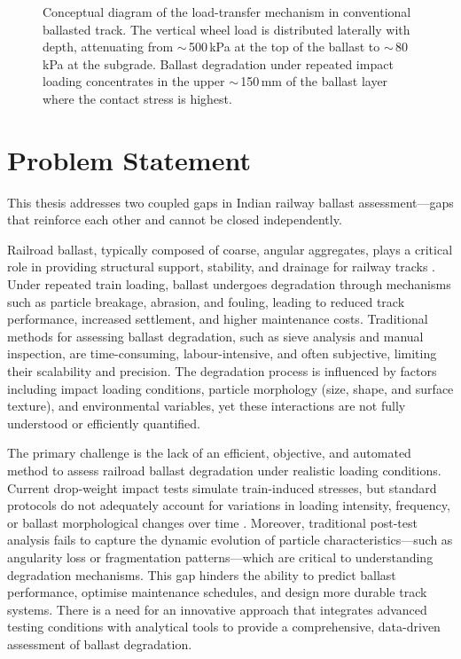 \begin{figure}[ht]
\caption{Conceptual diagram of the load-transfer mechanism in
         conventional ballasted track. The vertical wheel load is
         distributed laterally with depth, attenuating from
         $\sim$\,500\,kPa at the top of the ballast to $\sim$\,80\,kPa
         at the subgrade. Ballast degradation under repeated impact
         loading concentrates in the upper $\sim$\,150\,mm of the
         ballast layer where the contact stress is highest.}
\label{fig:load-transfer}
\end{figure}

\section{Problem Statement}
\label{sec:intro-problem}

This thesis addresses two coupled gaps in Indian railway ballast
assessment---gaps that reinforce each other and cannot be closed
independently.

Railroad ballast, typically composed of coarse, angular aggregates, plays a
critical role in providing structural support, stability, and drainage for
railway tracks \citep{Selig1994}. Under repeated train loading, ballast
undergoes degradation through mechanisms such as particle breakage,
abrasion, and fouling, leading to reduced track performance, increased
settlement, and higher maintenance costs. Traditional methods for assessing
ballast degradation, such as sieve analysis and manual inspection, are
time-consuming, labour-intensive, and often subjective, limiting their
scalability and precision. The degradation process is influenced by factors
including impact loading conditions, particle morphology (size, shape, and
surface texture), and environmental variables, yet these interactions are
not fully understood or efficiently quantified.

The primary challenge is the lack of an efficient, objective, and automated
method to assess railroad ballast degradation under realistic loading
conditions. Current drop-weight impact tests simulate train-induced
stresses, but standard protocols do not adequately account for variations
in loading intensity, frequency, or ballast morphological changes over time
\citep{Koohmishi2020}. Moreover, traditional post-test analysis fails to
capture the dynamic evolution of particle characteristics---such as
angularity loss or fragmentation patterns---which are critical to
understanding degradation mechanisms. This gap hinders the ability to
predict ballast performance, optimise maintenance schedules, and design
more durable track systems. There is a need for an innovative approach that
integrates advanced testing conditions with analytical tools to provide a
comprehensive, data-driven assessment of ballast degradation.

